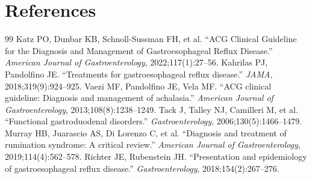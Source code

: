 \section*{References}
\begin{thebibliography}{99}
 Katz PO, Dunbar KB, Schnoll-Sussman FH, et al. ``ACG Clinical Guideline for the Diagnosis and Management of Gastroesophageal Reflux Disease.'' \textit{American Journal of Gastroenterology}, 2022;117(1):27--56.
 Kahrilas PJ, Pandolfino JE. ``Treatments for gastroesophageal reflux disease.'' \textit{JAMA}, 2018;319(9):924--925.
 Vaezi MF, Pandolfino JE, Vela MF. ``ACG clinical guideline: Diagnosis and management of achalasia.'' \textit{American Journal of Gastroenterology}, 2013;108(8):1238--1249.
 Tack J, Talley NJ, Camilleri M, et al. ``Functional gastroduodenal disorders.'' \textit{Gastroenterology}, 2006;130(5):1466--1479.
 Murray HB, Juarascio AS, Di Lorenzo C, et al. ``Diagnosis and treatment of rumination syndrome: A critical review.'' \textit{American Journal of Gastroenterology}, 2019;114(4):562--578.
 Richter JE, Rubenstein JH. ``Presentation and epidemiology of gastroesophageal reflux disease.'' \textit{Gastroenterology}, 2018;154(2):267--276.
\end{thebibliography}
